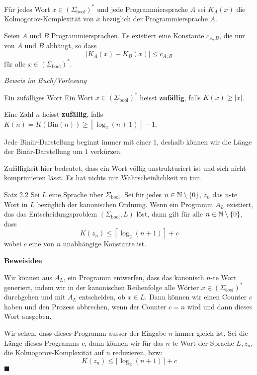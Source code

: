     Für jedes Wort $x \in (\Sigma_{\text{bool}})^*$ und jede Programmiersprache $A$ sei $K_A(x)$ die Kolmogorov-Komplexität von $x$ bezüglich der Programmiersprache $A$.
    \begin{mainbox}{}
        Seien $A$ und $B$ Programmiersprachen. Es existiert eine Konstante $c_{A,B}$, die nur von $A$ und $B$ abhängt, so dass 
        $$|K_A(x) -K_B(x)|\leq c_{A,B}$$
        für alle $x \in (\Sigma_{\text{bool}})^*$.
    \end{mainbox}
    \textit{Beweis im Buch/Vorlesung}

    \begin{mainbox}{Ein zufälliges Wort}
        Ein Wort $x \in (\Sigma_{\text{bool}})^*$ heisst \textbf{zufällig}, falls $K(x) \geq |x|$. 
        
        Eine Zahl $n$ heisst \textbf{zufällig}, falls $K(n) = K(\text{Bin}(n)) \geq \left\lceil\log_2(n + 1) \right\rceil - 1$.
    \end{mainbox}
    Jede Binär-Darstellung beginnt immer mit einer $1$, deshalb können wir die Länge der Binär-Darstellung um $1$ verkürzen.

    Zufälligkeit hier bedeutet, dass ein Wort völlig unstrukturiert ist und sich nicht komprimieren lässt. Es hat nichts mit Wahrscheinlichkeit zu tun.

    \begin{mainbox}{Satz 2.2}
        Sei $L$ eine Sprache über $\Sigma_{\text{bool}}$. Sei für jedes $n \in \mathbb{N} \setminus \{0\}$, $z_n$ das $n$-te Wort in $L$ bezüglich der kanonischen Ordnung. 
        Wenn ein Programm $A_L$ existiert, das das Entscheidungsproblem $(\Sigma_{\text{bool}}, L)$ löst, dann gilt für alle $n \in \mathbb{N}\setminus\{0\}$, dass
        $$K(z_n) \leq \left\lceil\log_2(n+1)\right\rceil + c$$
        wobei $c$ eine von $n$ unabhängige Konstante ist.
    \end{mainbox}
    \textbf{Beweisidee}

    Wir können aus $A_L$, ein Programm entwerfen, dass das kanonisch $n$-te Wort generiert, indem wir in der kanonischen Reihenfolge alle Wörter $x \in (\Sigma_{bool})^*$ durchgehen und mit $A_L$ entscheiden, ob $x \in L$. Dann können wir einen Counter $c$ haben und den Prozess abbrechen, wenn der Counter $c = n$ wird und dann dieses Wort ausgeben.

    Wir sehen, dass dieses Programm ausser der Eingabe $n$ immer gleich ist. Sei die Länge dieses Programms $c$, dann können wir für das $n$-te Wort der Sprache $L, z_n,$ die Kolmogorov-Komplexität auf $n$ reduzieren, bzw:
    $$K(z_n) \leq \lceil \log_2(n+1)\rceil + c$$
    \hspace*{0pt}\hfill$\blacksquare$



